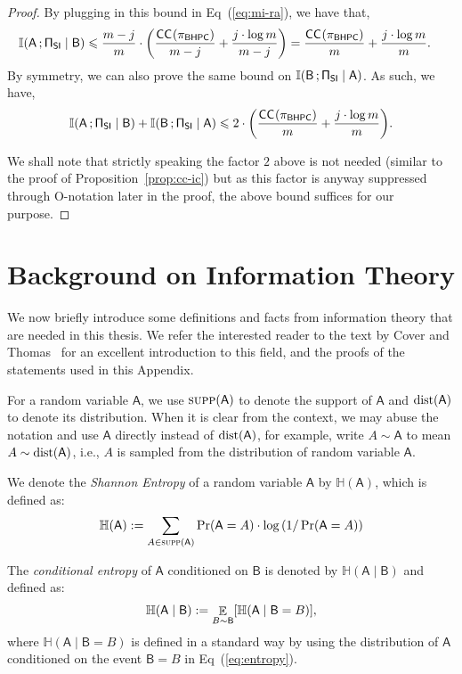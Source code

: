 \documentclass[11pt,letterpaper]{article}
\DeclareMathOperator*{\E}{\mathbb{E}}
\renewcommand{\leq}{\leqslant}
\theoremstyle{definition}
\newcommand{\bhpc}{\ensuremath{\textnormal{\textsf{BHPC}}}\xspace}
\newcommand{\bracket}[1]{\mleft[#1\mright]}
\newcommand{\paren}[1]{\ensuremath{\mleft(#1\mright)}\xspace}
\newcommand{\Prot}{\ensuremath{\Pi}}
\newcommand{\prot}{\ensuremath{\pi}}
\newcommand{\supp}[1]{\ensuremath{\textsc{supp}(#1)}}
\newcommand{\rA}{\rv{A}}
\newcommand{\rB}{\rv{B}}
\newcommand{\rv}[1]{\ensuremath{\mathsf{#1}}}
\newcommand{\II}{\ensuremath{\mathbb{I}}}
\newcommand{\HH}{\ensuremath{\mathbb{H}}}
\newcommand{\mi}[2]{\ensuremath{\II(#1 \,; #2)}}
\newcommand{\en}[1]{\ensuremath{\HH(#1)}}
\newcommand{\distribution}[1]{\ensuremath{\textnormal{dist}(#1)}\xspace}
\newcommand{\rProtSI}{\ensuremath{\rv{\Prot}}_{\ensuremath{\textnormal{\textsf{SI}}}}\xspace}
\newcommand{\CC}[2]{\ensuremath{\textnormal{\textsf{CC}}_{#2}(#1)}\xspace}
\begin{document}
\begin{proof}
By plugging in this bound in Eq~(\ref{eq:mi-ra}), we have that,
\begin{align*}
	\mi{\rA}{\rProtSI \mid \rB} &\leq \frac{m-j}{m} \cdot \paren{\frac{\CC{\prot_\bhpc}{} }{m-j}   + \frac{j \cdot \log{m}}{m-j}} = \frac{\CC{\prot_\bhpc}{} }{m}   + \frac{j \cdot \log{m}}{m}. 
\end{align*}
By symmetry, we can also prove the same bound on $\mi{\rB}{\rProtSI \mid \rA}$. As such, we have,
\begin{align*}
	\mi{\rA}{\rProtSI \mid \rB} + \mi{\rB}{\rProtSI \mid \rA} \leq 2 \cdot \paren{\frac{\CC{\prot_\bhpc}{} }{m}   + \frac{j \cdot \log{m}}{m}}.
\end{align*}

We shall note that strictly speaking the factor $2$ above is not needed (similar to the proof of Proposition~\ref{prop:cc-ic}) but as this factor is anyway suppressed through O-notation later in the proof, the above bound
suffices for our purpose. %

\end{proof}

\section{Background on Information Theory}\label{prelim-sec:info}

We now briefly introduce some definitions and facts from information theory that are needed in this thesis. We refer the interested reader to the text by Cover and Thomas~\cite{CoverT06} for an excellent introduction to this field, 
and the proofs of the statements used in this Appendix. 

For a random variable $\rA$, we use $\supp{\rA}$ to denote the support of $\rA$ and $\distribution{\rA}$ to denote its distribution. 
When it is clear from the context, we may abuse the notation and use $\rA$ directly instead of $\distribution{\rA}$, for example, write 
$A \sim \rA$ to mean $A \sim \distribution{\rA}$, i.e., $A$ is sampled from the distribution of random variable $\rA$. 


We denote the \emph{Shannon Entropy} of a random variable $\rA$ by
$\en{\rA}$, which is defined as: 
\begin{align}
	\en{\rA} := \sum_{A \in \supp{\rA}} \Pr\paren{\rA = A} \cdot \log{\paren{1/\Pr\paren{\rA = A}}} \label{eq:entropy}
\end{align} 

\noindent
The \emph{conditional entropy} of $\rA$ conditioned on $\rB$ is denoted by $\en{\rA \mid \rB}$ and defined as:
\begin{align}
\en{\rA \mid \rB} := \E_{B \sim \rB} \bracket{\en{\rA \mid \rB = B}}, \label{eq:cond-entropy}
\end{align}
where 
$\en{\rA \mid \rB = B}$ is defined in a standard way by using the distribution of $\rA$ conditioned on the event $\rB = B$ in Eq~(\ref{eq:entropy}). 
\end{document}
